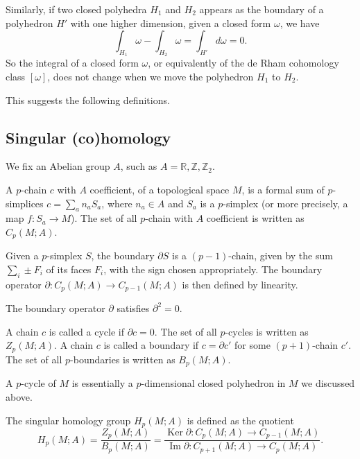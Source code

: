 \documentclass[12pt]{article}
\numberwithin{equation}{section}
\theoremstyle{remark}
\def\bR{\mathbb{R}}
\def\bZ{\mathbb{Z}}
\def\Ker{\mathop{\mathrm{Ker}}}
\def\Im{\mathop{\mathrm{Im}}}
\begin{document}
Similarly, if two closed polyhedra $H_1$ and $H_2$ appears as the boundary of 
a polyhedron $H'$ with one higher dimension, given a closed form $\omega$, we have \begin{equation}
\int_{H_1} \omega - \int_{H_2} \omega = \int_{H'} d\omega = 0.
\end{equation}
So the integral of a closed form $\omega$, or equivalently of the de Rham cohomology class $[\omega]$,
does not change when we move the polyhedron $H_1$ to $H_2$.

This suggests the following definitions.

\subsection{Singular (co)homology}

We fix an Abelian group $A$, such as $A=\bR, \bZ, \bZ_2$.
\begin{definition}
A $p$-chain $c$ with $A$ coefficient, of a topological space $M$, is a formal sum of $p$-simplices $c=\sum_a n_a S_a$,
where $n_a\in A$ and $S_a$ is a $p$-simplex (or more precisely, a map $f:S_a\to M$).
The set of all $p$-chain with $A$ coefficient is written as $C_p(M;A)$.
\end{definition}

\begin{definition}
Given a $p$-simplex $S$, the boundary $\partial S$ is a $(p-1)$-chain, given by the sum $\sum_i \pm F_i$ of its faces $F_i$, with the sign chosen appropriately.
The boundary operator $\partial:C_p(M;A)\to C_{p-1}(M;A)$ is then defined by linearity.
\end{definition}

\begin{proposition}
The boundary operator $\partial$ satisfies $\partial^2=0$.
\end{proposition}

\begin{definition}
A chain $c$ is called a cycle if $\partial c=0$.
The set of all $p$-cycles is written as $Z_p(M;A)$.
A chain $c$ is called a boundary if $c=\partial c'$ for some $(p+1)$-chain $c'$.
The set of all $p$-boundaries is written as $B_p(M;A)$.
\end{definition}

A $p$-cycle of $M$ is essentially a $p$-dimensional closed polyhedron in $M$ we discussed above. 

\begin{definition}
The singular homology group $H_p(M;A)$ is defined as the quotient \begin{equation}
H_p(M;A) = \frac{Z_p(M;A)}{B_p(M;A)} = \frac{\Ker \partial: C_p(M;A)\to C_{p-1}(M;A)}{\Im \partial: C_{p+1}(M;A)\to C_p(M;A)}.
\end{equation}
\end{definition}
\end{document}
